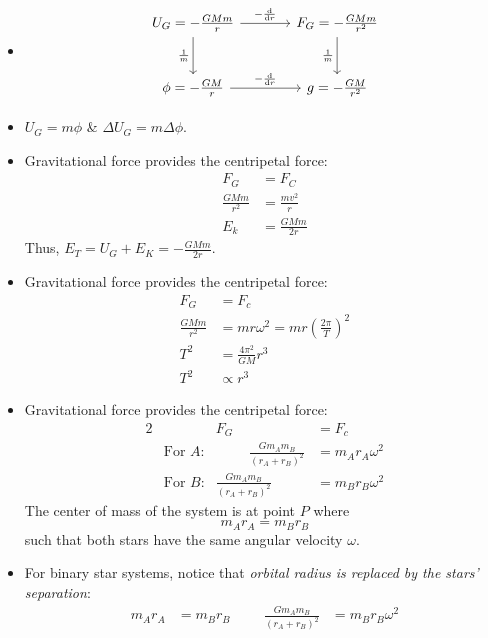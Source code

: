 \begin{itemize}[label=\(\square\)]
    \item \[
\begin{tikzcd}[row sep=large, column sep=large]
     U_G=-\frac{GMm}{r} \arrow{r}{-\frac{\text{d}}{\text{d}r}} \arrow[swap]{d}{\frac{1}{m}} & F_G=-\frac{GMm}{r^2} \arrow[swap]{d}{\frac{1}{m}} \\
     \phi=-\frac{GM}{r} \arrow{r}{-\frac{\text{d}}{\text{d}r}} & g=-\frac{GM}{r^2}
\end{tikzcd}
\]
\item \(U_G=m\phi\) \& \(\Delta U_G=m\Delta\phi\).
\item Gravitational force provides the centripetal force:
\begin{align*}
    F_G&=F_C\\
    \frac{GMm}{r^2}&=\frac{mv^2}{r}\\
    E_k&=\frac{GMm}{2r}
\end{align*}
Thus, \(E_T=U_G+E_K=-\frac{GMm}{2r}\).
\item Gravitational force provides the centripetal force:
\begin{align*}
    F_G&=F_c\\
    \frac{GMm}{r^2}&=mr\omega^2=mr\left(\frac{2\pi}{T}\right)^2\\
    T^2&=\frac{4\pi^2}{GM}r^3\\
    T^2 &\propto r^3
\end{align*}
\item Gravitational force provides the centripetal force:
\begin{alignat*}{2}
    && F_G&=F_c\\
    &\text{For \(A\):}& \hspace{1cm} \frac{Gm_Am_B}{(r_A+r_B)^2}&=m_Ar_A\omega^2\\
    &\text{For \(B\):}& \frac{Gm_Am_B}{(r_A+r_B)^2}&=m_Br_B\omega^2
\end{alignat*}
The center of mass of the system is at point \(P\) where 
\[m_Ar_A=m_Br_B\]
such that both stars have the same angular velocity \(\omega\).
\item For binary star systems, notice that \emph{orbital radius is replaced by the stars' separation}:
\begin{align*}
    m_Ar_A&=m_Br_B& && \frac{Gm_Am_B}{(r_A+r_B)^2}&=m_Br_B\omega^2\\

\end{align*}
\end{itemize}
